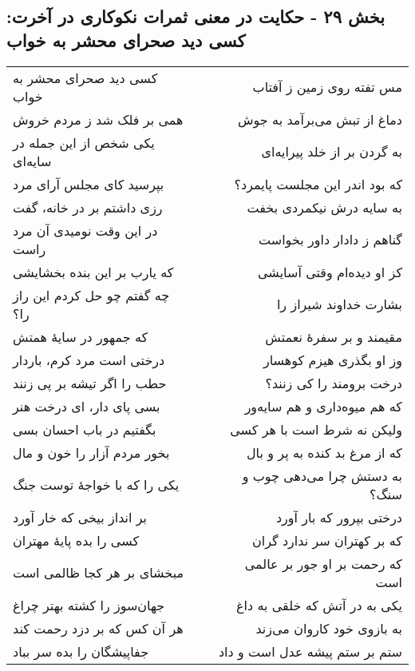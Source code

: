 \begin{center}
\section*{بخش ۲۹ - حکایت در معنی ثمرات نکوکاری در آخرت: کسی دید صحرای محشر به خواب}
\label{sec:029}
\begin{longtable}{l p{0.5cm} r}
کسی دید صحرای محشر به خواب
&&
مس تفته روی زمین ز آفتاب
\\
همی بر فلک شد ز مردم خروش
&&
دماغ از تبش می‌برآمد به جوش
\\
یکی شخص از این جمله در سایه‌ای
&&
به گردن بر از خلد پیرایه‌ای
\\
بپرسید کای مجلس آرای مرد
&&
که بود اندر این مجلست پایمرد؟
\\
رزی داشتم بر در خانه، گفت
&&
به سایه درش نیکمردی بخفت
\\
در این وقت نومیدی آن مرد راست
&&
گناهم ز دادار داور بخواست
\\
که یارب بر این بنده بخشایشی
&&
کز او دیده‌ام وقتی آسایشی
\\
چه گفتم چو حل کردم این راز را؟
&&
بشارت خداوند شیراز را
\\
که جمهور در سایهٔ همتش
&&
مقیمند و بر سفرهٔ نعمتش
\\
درختی است مرد کرم، باردار
&&
وز او بگذری هیزم کوهسار
\\
حطب را اگر تیشه بر پی زنند
&&
درخت برومند را کی زنند؟
\\
بسی پای دار، ای درخت هنر
&&
که هم میوه‌داری و هم سایه‌ور
\\
بگفتیم در باب احسان بسی
&&
ولیکن نه شرط است با هر کسی
\\
بخور مردم آزار را خون و مال
&&
که از مرغ بد کنده به پر و بال
\\
یکی را که با خواجهٔ توست جنگ
&&
به دستش چرا می‌دهی چوب و سنگ؟
\\
بر انداز بیخی که خار آورد
&&
درختی بپرور که بار آورد
\\
کسی را بده پایهٔ مهتران
&&
که بر کهتران سر ندارد گران
\\
مبخشای بر هر کجا ظالمی است
&&
که رحمت بر او جور بر عالمی است
\\
جهان‌سوز را کشته بهتر چراغ
&&
یکی به در آتش که خلقی به داغ
\\
هر آن کس که بر دزد رحمت کند
&&
به بازوی خود کاروان می‌زند
\\
جفاپیشگان را بده سر بباد
&&
ستم بر ستم پیشه عدل است و داد
\\
\end{longtable}
\end{center}
